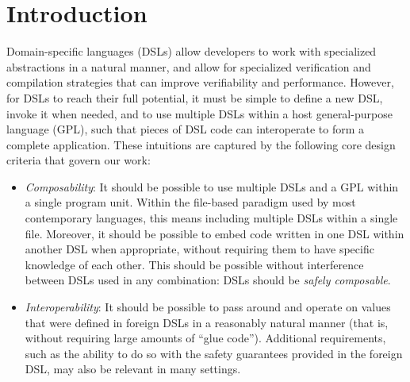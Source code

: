 \section{Introduction}
\label{s:intro}

Domain-specific languages (DSLs) \cite{fowler2010domain} %
allow developers to work with   
specialized abstractions in a natural manner, and allow for specialized 
verification and compilation strategies that can improve verifiability and performance. However, for DSLs to reach their full
potential, it must be simple to define a new DSL, invoke it when needed, and to use multiple
DSLs within a host general-purpose language (GPL), such that pieces of DSL code
 can interoperate to form a complete application. These intuitions are captured by the following core design criteria that govern our work:

\begin{itemize}

\item \emph {Composability}: It should be possible to use multiple DSLs and a GPL
within a single program unit.  %
Within the file-based paradigm used by most contemporary languages, this 
means including multiple DSLs within a single file.
 Moreover, it should be possible to embed code written in one DSL
  within another DSL when appropriate, without requiring them to have specific knowledge of each other. This should be possible without interference between DSLs used in any combination: DSLs should be \emph{safely composable}.

\item \emph{Interoperability}: It should be
  possible to pass around and operate on values 
  that were defined in foreign DSLs in a reasonably natural manner (that is, without requiring large amounts of ``glue code''). Additional requirements, such as the ability to do so with the safety guarantees provided in the foreign DSL, may also be relevant in many settings. 
  
\end{itemize}


